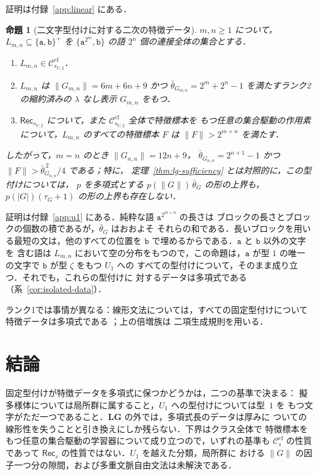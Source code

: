 \documentclass[11pt,a4paper]{ltjsarticle}
\numberwithin{equation}{section}
\theoremstyle{plain}
\newtheorem{proposition}[theorem]{命題}
\theoremstyle{definition}
\theoremstyle{remark}
\theoremstyle{plain}
\newcommand{\cf}{\mathrm{cf}}
\newcommand{\Ccf}[1]{\mathcal C_{#1}^{\cf}}
\newcommand{\Rec}{\mathsf{Rec}}
\newcommand{\LG}{\mathbf{LG}}
\begin{document}
証明は付録~\ref{app:linear} にある．

\begin{proposition}[二文字型付けに対する二次の特徴データ]
\label{prop:binary-quadratic}
$m,n\ge1$ について，$L_{m,n}\subseteq\{\mathtt a,\mathtt b\}^+$ を
$\{\mathtt a^{2^m},\mathtt b\}$ の語 $2^n$ 個の連接全体の集合とする．
\begin{enumerate}[label=\textup{(\roman*)},leftmargin=*]
\item $L_{m,n}\in\Ccf{s_{U,2}}$．
\item $L_{m,n}$ は $\|G_{m,n}\|=6m+6n+9$ かつ
$\bar\theta_{G_{m,n}}=2^m+2^n-1$ を満たすランク2の縮約済みの $\lambda$ なし表示
$G_{m,n}$ をもつ．
\item $\Rec_{s_{U,2}}$ について，また $\Ccf{s_{U,2}}$ 全体で特徴標本を
もつ任意の集合駆動の作用素について，$L_{m,n}$ のすべての特徴標本 $F$ は
$\|F\|>2^{m+n}$ を満たす．
\end{enumerate}
したがって，$m=n$ のとき $\|G_{n,n}\|=12n+9$，
$\bar\theta_{G_{n,n}}=2^{n+1}-1$ かつ
$\|F\|>\bar\theta_{G_{n,n}}^{\,2}/4$ である；特に，
定理~\ref{thm:lg-sufficiency} とは対照的に，この型付けについては，
$p$ を多項式とする $p(\|G\|)\,\bar\theta_G$ の形の上界も，
$p(|G|)(\tau_G+1)$ の形の上界も存在しない．
\end{proposition}

証明は付録~\ref{app:u1} にある．純粋な語 $\mathtt a^{2^{m+n}}$ の長さは
ブロックの長さとブロックの個数の積であるが，$\bar\theta_G$ はおおよそ
それらの和である．長いブロックを用いる最短の文は，他のすべての位置を
$\mathtt b$ で埋めるからである．$\mathtt a$ と $\mathtt b$ 以外の文字を
含む語は $L_{m,n}$ において空の分布をもつので，この命題は，$\mathtt a$
が型 $1$ の唯一の文字で $\mathtt b$ が型 $\zeta$ をもつ $U_1$ への
すべての型付けについて，そのまま成り立つ．それでも，これらの型付けに
対するデータは多項式である（系~\ref{cor:isolated-data}）．

ランク1では事情が異なる：線形文法については，すべての固定型付けについて
特徴データは多項式である \cite[第~8~節]{kuriyamaCFG}；上の倍増族は
二項生成規則を用いる．

\section{結論}
\label{sec:conclusion}
固定型付けが特徴データを多項式に保つかどうかは，二つの基準で決まる：
擬多様体については局所群に属すること，$U_1$ への型付けについては型~$1$ を
もつ文字がただ一つであること．$\LG$ の外では，多項式長のデータは厚みに
ついての線形性を失うことと引き換えにしか残らない．下界はクラス全体で
特徴標本をもつ任意の集合駆動の学習器について成り立つので，いずれの基準も
$\Ccf{s}$ の性質であって $\Rec_s$ の性質ではない．$U_1$ を越えた分類，局所群に
おける $\|G\|$ の因子一つ分の隙間，および多重文脈自由文法は未解決である．
\end{document}
